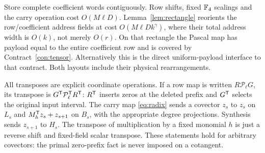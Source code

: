 Store complete coefficient words contiguously. Row shifts, fixed
$\mathbb F_4$ scalings and the carry operation cost $O(M\ell D)$.
Lemma~\ref{lem:rectangle} reorients the row/coefficient address
fields at cost $O(M\ell D k^\gamma)$, where their total address
width is $O(k)$, not merely $O(r)$. On that rectangle the Pascal
map has payload equal to the entire coefficient row and is covered
by Contract~\ref{con:tensor}. Alternatively this is the direct
uniform-payload interface to that contract. Both layouts include
their physical rearrangements.

All transposes are explicit coordinate operations. If a row map is
written $R\mathcal P_\ell G$, its transpose is
$G^{\mathsf T}\mathcal P_\ell^{\mathsf T}R^{\mathsf T}$: $R^{\mathsf T}$ inserts zeros at the
deleted prefix and $G^{\mathsf T}$ selects the original input interval.
The carry map \eqref{eq:radix} sends a covector $z_s$ to $z_s$ on
$L_s$ and $M_h^{\mathsf T}z_s+z_{s+1}$ on $B_s$, with the appropriate
degree projections. Synthesis sends $z_{s+1}$ to $H_s$.
The transpose of multiplication by a fixed monomial $h$ is just a
reverse shift and fixed-field scalar transpose. These statements hold
for arbitrary covectors: the primal zero-prefix fact is never imposed
on a cotangent.

